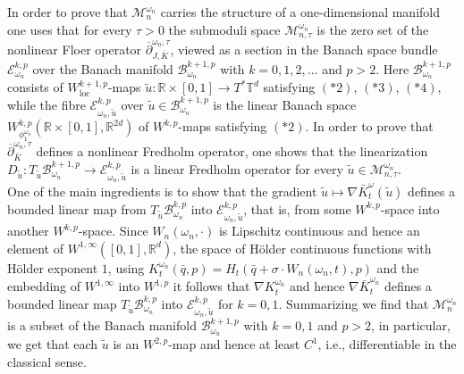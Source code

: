 \documentclass[a4paper,11pt]{amsart}
\newcommand{\RR}{\mathbb{R}}
\newcommand{\TT}{\mathbb{T}}
\begin{document}
\indent In order to prove that $\mathcal{M}^{\omega_n}_n$ carries the structure of a one-dimensional manifold one uses that for every $\tau>0$ the submoduli space $\mathcal{M}^{\omega_n}_{n,\tau}$ is the zero set of the nonlinear Floer operator $\overline{\partial}^{\omega_n,\tau}_{J,\bar{K}}$, viewed as a section in the Banach space bundle $\mathcal{E}^{k,p}_{\omega_n}$ over the Banach manifold $\mathcal{B}^{k+1,p}_{\omega_n}$ with $k=0,1,2,\ldots$ and $p>2$. Here $\mathcal{B}^{k+1,p}_{\omega_n}$ consists of $W^{k+1,p}_{\textrm{loc}}$-maps $\widetilde{u}:\RR\times [0,1]\to T^*\TT^d$ satisfying $(*2)$, $(*3)$, $(*4)$, while the fibre $\mathcal{E}^{k,p}_{\omega_n,\widetilde{u}}$ over $\widetilde{u}\in\mathcal{B}^{k+1,p}_{\omega_n}$ is the linear Banach space $W^{k,p}_{\phi^{\omega_n}_1}(\RR\times [0,1],\RR^{2d})$ of $W^{k,p}$-maps satisfying $(*2)$. In order to prove that $\overline{\partial}^{\omega_n,\tau}_{\bar{K}}$ defines a nonlinear Fredholm operator, one shows that the linearization $D_{\widetilde{u}}: T_{\widetilde{u}}\mathcal{B}^{k+1,p}_{\omega_n}\to \mathcal{E}^{k,p}_{\omega_n,\widetilde{u}}$ is a linear Fredholm operator for every $\widetilde{u}\in\mathcal{M}^{\omega_n}_{n,\tau}$. \\ \indent One of the main ingredients is to show that the gradient $\widetilde{u}\mapsto\nabla {\bar{K}}^{\omega}_t(\widetilde{u})$ defines a bounded linear map from $T_{\widetilde{u}}\mathcal{B}^{k,p}_{\omega_n}$ into $\mathcal{E}^{k,p}_{\omega_n,\widetilde{u}}$, that is, from some $W^{k,p}$-space into another $W^{k,p}$-space.  Since $W_n(\omega_n,\cdot)$ is Lipschitz continuous and hence an element of $W^{1,\infty}([0,1],\RR^d)$, the space of H\"older continuous functions with H\"older exponent $1$, using $K^{\omega_n}_t(\bar{q},p)=H_t(\bar{q}+\sigma\cdot W_n(\omega_n,t),p)$ and the embedding of $W^{1,\infty}$ into $W^{1,p}$ it follows that $\nabla K^{\omega_n}_t$ and hence $\nabla \bar{K}^{\omega_n}_t$ defines a bounded linear map $T_{\widetilde{u}}\mathcal{B}^{k,p}_{\omega_n}$ into $\mathcal{E}^{k,p}_{\omega_n,\widetilde{u}}$ for $k=0,1$. Summarizing we find that $\mathcal{M}^{\omega_n}_n$ is a subset of the Banach manifold $\mathcal{B}^{k+1,p}_{\omega_n}$ with $k=0,1$ and $p>2$, in particular, we get that each $\widetilde{u}$ is an $W^{2,p}$-map and hence at least $C^1$, i.e., differentiable in the classical sense. \\
\end{document}
